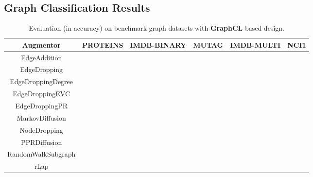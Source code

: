 \documentclass{article}
\theoremstyle{plain}
\theoremstyle{definition}
\theoremstyle{remark}
\begin{document}
\subsection{Graph Classification Results}



\begin{table*}[ht!]
\centering
\caption{Evaluation (in accuracy) on benchmark graph datasets with \textbf{GraphCL} based design.}
\label{table:results_graphcl}
\vskip 0.15in
\begin{center}
\begin{small}
\begin{sc}
\begin{tabular}{c|c|c|c|c|c}
\toprule
Augmentor & PROTEINS & IMDB-BINARY & MUTAG & IMDB-MULTI & NCI1 \\
\midrule
EdgeAddition &   &    &    &   &  \\
EdgeDropping &   &   &   &    &  \\
EdgeDroppingDegree &  &  &  & \underline{} &    \\
EdgeDroppingEVC &  & \underline{}  &  &   &   \\
EdgeDroppingPR &   &   &  &  & \underline{} \\
MarkovDiffusion &   &   &  &   & \\
NodeDropping &   &   &    &   &  \\
PPRDiffusion &    &    & \underline{}  &  &  \\
RandomWalkSubgraph & \underline{}  &   &    &  &  \\
rLap &   &   &   &  &   \\
\bottomrule
\end{tabular}
\end{sc}
\end{small}
\end{center}
\vskip -0.1in
\end{table*}
\end{document}
